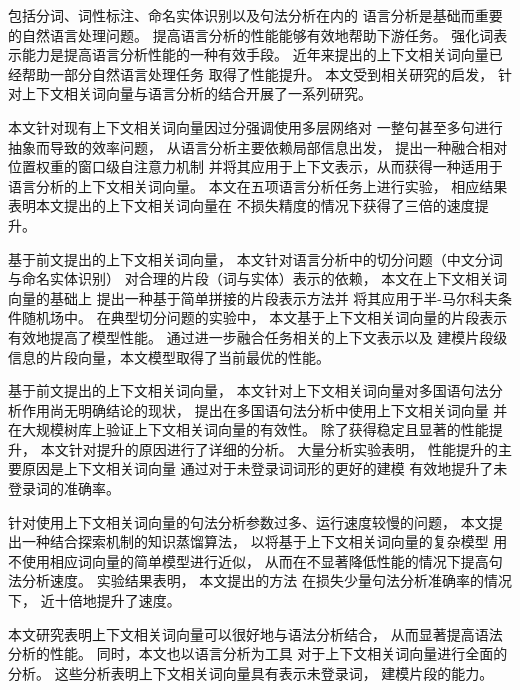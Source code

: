 \begin{conclusions}

包括分词、词性标注、命名实体识别以及句法分析在内的
语言分析是基础而重要的自然语言处理问题。
提高语言分析的性能能够有效地帮助下游任务。
强化词表示能力是提高语言分析性能的一种有效手段。
近年来提出的上下文相关词向量已经帮助一部分自然语言处理任务
取得了性能提升。
本文受到相关研究的启发，
针对上下文相关词向量与语言分析的结合开展了一系列研究。

本文针对现有上下文相关词向量因过分强调使用多层网络对
一整句甚至多句进行抽象而导致的效率问题，
从语言分析主要依赖局部信息出发，
提出一种融合相对位置权重的窗口级自注意力机制
并将其应用于上下文表示，从而获得一种适用于语言分析的上下文相关词向量。
本文在五项语言分析任务上进行实验，
相应结果表明本文提出的上下文相关词向量在
不损失精度的情况下获得了三倍的速度提升。

基于前文提出的上下文相关词向量，
本文针对语言分析中的切分问题（中文分词与命名实体识别）
对合理的片段（词与实体）表示的依赖，
本文在上下文相关词向量的基础上
提出一种基于简单拼接的片段表示方法并
将其应用于半-马尔科夫条件随机场中。
在典型切分问题的实验中，
本文基于上下文相关词向量的片段表示有效地提高了模型性能。
通过进一步融合任务相关的上下文表示以及
建模片段级信息的片段向量，本文模型取得了当前最优的性能。

基于前文提出的上下文相关词向量，
本文针对上下文相关词向量对多国语句法分析作用尚无明确结论的现状，
提出在多国语句法分析中使用上下文相关词向量
并在大规模树库上验证上下文相关词向量的有效性。
除了获得稳定且显著的性能提升，
本文针对提升的原因进行了详细的分析。
大量分析实验表明，
性能提升的主要原因是上下文相关词向量
通过对于未登录词词形的更好的建模
有效地提升了未登录词的准确率。

针对使用上下文相关词向量的句法分析参数过多、运行速度较慢的问题，
本文提出一种结合探索机制的知识蒸馏算法，
以将基于上下文相关词向量的复杂模型
用不使用相应词向量的简单模型进行近似，
从而在不显著降低性能的情况下提高句法分析速度。
实验结果表明，
本文提出的方法
在损失少量句法分析准确率的情况下，
近十倍地提升了速度。

本文研究表明上下文相关词向量可以很好地与语法分析结合，
从而显著提高语法分析的性能。
同时，本文也以语言分析为工具
对于上下文相关词向量进行全面的分析。
这些分析表明上下文相关词向量具有表示未登录词，
建模片段的能力。
%

\end{conclusions}
